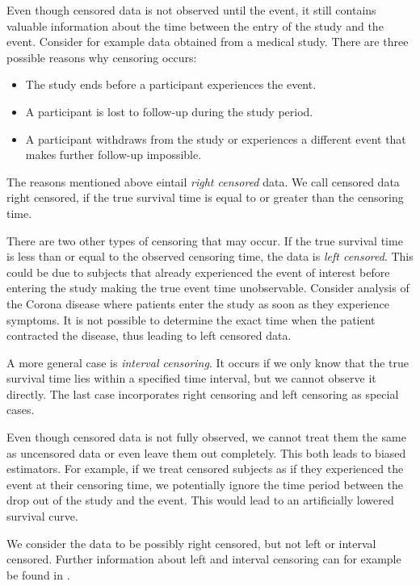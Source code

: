 \documentclass[12pt, a4paper]{scrartcl}
\theoremstyle{definition}
\theoremstyle{plain}
\numberwithin{equation}{section}
\numberwithin{figure}{section}
\numberwithin{table}{section}
\begin{document}
	Even though censored data is not observed until the event, it still contains valuable information about the time between the entry of the study and the event.
	Consider for example data obtained from a medical study.
	There are three possible reasons why censoring occurs:
	\begin{itemize}
		\item The study ends before a participant experiences the event.
		\item A participant is lost to follow-up during the study period. %
		\item A participant withdraws from the study or experiences a different event that makes further follow-up impossible.
	\end{itemize}
	The reasons mentioned above eintail \emph{right censored} data.
	We call censored data right censored, if the true survival time is equal to or greater than the censoring time.
	
	There are two other types of censoring that may occur.
	If the true survival time is less than or equal to the observed censoring time, the data is \emph{left censored}.
	This could be due to subjects that already experienced the event of interest before entering the study making the true event time unobservable.
	Consider analysis of the Corona disease where patients enter the study as soon as they experience symptoms.
	It is not possible to determine the exact time when the patient contracted the disease, thus leading to left censored data.
	
	A more general case is \emph{interval censoring}.
	It occurs if we only know that the true survival time lies within a specified time interval, but we cannot observe it directly.
	The last case incorporates right censoring and left censoring as special cases.
	
	Even though censored data is not fully observed, we cannot treat them the same as uncensored data or even leave them out completely.
	This both leads to biased estimators.
	For example, if we treat censored subjects as if they experienced the event at their censoring time, we potentially ignore the time period between the drop out of the study and the event.
	This would lead to an artificially lowered survival curve.
		
	We consider the data to be possibly right censored, but not left or interval censored.
	Further information about left and interval censoring can for example be found in \citet*{bookfailuretime}.
\end{document}
